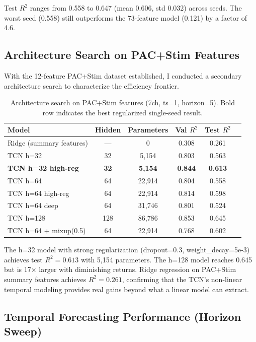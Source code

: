 \documentclass[11pt,letterpaper]{article}
\begin{document}
Test $R^2$ ranges from 0.558 to 0.647 (mean 0.606, std 0.032) across seeds. The worst seed (0.558) still outperforms the 73-feature model (0.121) by a factor of 4.6.

\subsection{Architecture Search on PAC+Stim Features}

With the 12-feature PAC+Stim dataset established, I conducted a secondary architecture search to characterize the efficiency frontier.

\begin{table}[htbp]
\centering
\caption{Architecture search on PAC+Stim features (7ch, ts=1, horizon=5). Bold row indicates the best regularized single-seed result.}
\label{tab:arch_search_pacstim}
\small
\begin{tabular}{lccccc}
\toprule
\textbf{Model} & \textbf{Hidden} & \textbf{Parameters} & \textbf{Val $R^2$} & \textbf{Test $R^2$} \\
\midrule
Ridge (summary features) & --- & 0 & 0.308 & 0.261 \\
TCN h=32 & 32 & 5,154 & 0.803 & 0.563 \\
\textbf{TCN h=32 high-reg} & \textbf{32} & \textbf{5,154} & \textbf{0.844} & \textbf{0.613} \\
TCN h=64 & 64 & 22,914 & 0.804 & 0.558 \\
TCN h=64 high-reg & 64 & 22,914 & 0.814 & 0.598 \\
TCN h=64 deep & 64 & 31,746 & 0.801 & 0.524 \\
TCN h=128 & 128 & 86,786 & 0.853 & 0.645 \\
TCN h=64 + mixup(0.5) & 64 & 22,914 & 0.768 & 0.602 \\
\bottomrule
\end{tabular}
\end{table}

The h=32 model with strong regularization (dropout=0.3, weight\_decay=5e-3) achieves test $R^2 = 0.613$ with 5,154 parameters. The h=128 model reaches 0.645 but is 17$\times$ larger with diminishing returns. Ridge regression on PAC+Stim summary features achieves $R^2 = 0.261$, confirming that the TCN's non-linear temporal modeling provides real gains beyond what a linear model can extract.

\subsection{Temporal Forecasting Performance (Horizon Sweep)}
\end{document}
